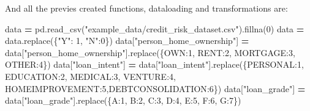 \documentclass[
]{book}
\newenvironment{Shaded}{\begin{snugshade}}{\end{snugshade}}
\newcommand{\DecValTok}[1]{\textcolor[rgb]{0.00,0.00,0.81}{#1}}
\newcommand{\NormalTok}[1]{#1}
\newcommand{\OperatorTok}[1]{\textcolor[rgb]{0.81,0.36,0.00}{\textbf{#1}}}
\newcommand{\StringTok}[1]{\textcolor[rgb]{0.31,0.60,0.02}{#1}}
\begin{document}
And all the previes created functions, dataloading and transformations are:

\begin{Shaded}
\begin{Highlighting}[]
\NormalTok{data }\OperatorTok{=}\NormalTok{ pd.read\_csv(}\StringTok{"example\_data/credit\_risk\_dataset.csv"}\NormalTok{).fillna(}\DecValTok{0}\NormalTok{)}
\NormalTok{data }\OperatorTok{=}\NormalTok{ data.replace(\{}\StringTok{"Y"}\NormalTok{: }\DecValTok{1}\NormalTok{, }\StringTok{"N"}\NormalTok{:}\DecValTok{0}\NormalTok{\})}
\NormalTok{data[}\StringTok{"person\_home\_ownership"}\NormalTok{] }\OperatorTok{=}\NormalTok{ data[}\StringTok{"person\_home\_ownership"}\NormalTok{].replace(\{}\StringTok{\textquotesingle{}OWN\textquotesingle{}}\NormalTok{:}\DecValTok{1}\NormalTok{, }\StringTok{\textquotesingle{}RENT\textquotesingle{}}\NormalTok{:}\DecValTok{2}\NormalTok{, }\StringTok{\textquotesingle{}MORTGAGE\textquotesingle{}}\NormalTok{:}\DecValTok{3}\NormalTok{, }\StringTok{\textquotesingle{}OTHER\textquotesingle{}}\NormalTok{:}\DecValTok{4}\NormalTok{\})}
\NormalTok{data[}\StringTok{"loan\_intent"}\NormalTok{] }\OperatorTok{=}\NormalTok{ data[}\StringTok{"loan\_intent"}\NormalTok{].replace(\{}\StringTok{\textquotesingle{}PERSONAL\textquotesingle{}}\NormalTok{:}\DecValTok{1}\NormalTok{, }\StringTok{\textquotesingle{}EDUCATION\textquotesingle{}}\NormalTok{:}\DecValTok{2}\NormalTok{, }\StringTok{\textquotesingle{}MEDICAL\textquotesingle{}}\NormalTok{:}\DecValTok{3}\NormalTok{, }\StringTok{\textquotesingle{}VENTURE\textquotesingle{}}\NormalTok{:}\DecValTok{4}\NormalTok{, }\StringTok{\textquotesingle{}HOMEIMPROVEMENT\textquotesingle{}}\NormalTok{:}\DecValTok{5}\NormalTok{,}\StringTok{\textquotesingle{}DEBTCONSOLIDATION\textquotesingle{}}\NormalTok{:}\DecValTok{6}\NormalTok{\})}
\NormalTok{data[}\StringTok{"loan\_grade"}\NormalTok{] }\OperatorTok{=}\NormalTok{ data[}\StringTok{"loan\_grade"}\NormalTok{].replace(\{}\StringTok{\textquotesingle{}A\textquotesingle{}}\NormalTok{:}\DecValTok{1}\NormalTok{, }\StringTok{\textquotesingle{}B\textquotesingle{}}\NormalTok{:}\DecValTok{2}\NormalTok{, }\StringTok{\textquotesingle{}C\textquotesingle{}}\NormalTok{:}\DecValTok{3}\NormalTok{, }\StringTok{\textquotesingle{}D\textquotesingle{}}\NormalTok{:}\DecValTok{4}\NormalTok{, }\StringTok{\textquotesingle{}E\textquotesingle{}}\NormalTok{:}\DecValTok{5}\NormalTok{, }\StringTok{\textquotesingle{}F\textquotesingle{}}\NormalTok{:}\DecValTok{6}\NormalTok{, }\StringTok{\textquotesingle{}G\textquotesingle{}}\NormalTok{:}\DecValTok{7}\NormalTok{\})}


\end{Highlighting}
\end{Shaded}
\end{document}
